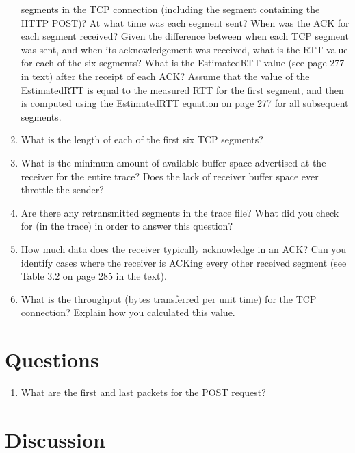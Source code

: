 \documentclass[10pt]{article}
\begin{document}
\begin{enumerate}
{  segments in the TCP connection (including the segment containing the
  HTTP POST)? At what time was each segment sent? When was the ACK for each
  segment received? Given the difference between when each TCP segment was
  sent, and when its acknowledgement was received, what is the RTT value for
  each of the six segments? What is the EstimatedRTT value (see page 277 in
  text) after the receipt of each ACK? Assume that the value of the
  EstimatedRTT is equal to the measured RTT for the first segment, and then
  is computed using the EstimatedRTT equation on page 277 for all subsequent
  segments.}
  \item{What is the length of each of the first six TCP segments?}
  \item{What is the minimum amount of available buffer space advertised at
    the receiver for the entire trace? Does the lack of receiver buffer space
    ever throttle the sender?}
  \item{Are there any retransmitted segments in the trace file? What did you
    check for (in the trace) in order to answer this question?}
  \item{How much data does the receiver typically acknowledge in an ACK?
    Can you identify cases where the receiver is ACKing every other
    received segment (see Table 3.2 on page 285 in the text).}
  \item{What is the throughput (bytes transferred per unit time)
    for the TCP connection? Explain how you calculated this value.}
\end{enumerate}




\section{Questions}
\begin{enumerate}
  \item{What are the first and last packets for the POST request?}
  \subitem{}
\end{enumerate}


\section{Discussion}
\end{document}
